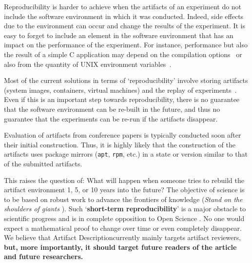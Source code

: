\documentclass[sigconf,natbib=false]{acmart}
\newcommand{\repro}{reproducibility}
\newcommand{\ad}{Artifact Description}
\begin{document}

Reproducibility is harder to achieve when the artifacts of an experiment do not include the software environment in which it was conducted.
Indeed, side effects due to the environment can occur and change the results of the experiment.
It is easy to forget to include an element in the software environment that has an impact on the performance of the experiment.
For instance, performance but also the result of a simple C application may depend on the compilation options\ \cite{stodden2018assessing} or also from the quantity of UNIX environment variables\ \cite{mytkowicz2009producing}.

Most of the current solutions in terms of `\repro' involve storing artifacts (system images, containers, virtual machines) and the replay of experiments\ \cite{rosendo2020e2clab, brammer2011paper, brinckman2019computing}.
Even if this is an important step towards \repro, there is no guarantee that the software environment can be re-built in the future, and thus no guarantee that the experiments can be re-run if the artifacts disappear. 

Evaluation of artifacts from conference papers is typically conducted soon after their initial construction.
Thus, it is highly likely that the construction of the artifacts uses package mirrors (\texttt{apt}, \texttt{rpm}, etc.) in a state or version similar to that of the submitted artifacts.

This raises the question of: What will happen when someone tries to rebuild the artifact environment 1, 5, or 10 years into the future?
The objective of science is to be based on robust work to advance the frontiers of knowledge (\emph{Stand on the shoulders of giants} \cite{giant}).
Such `\textbf{short-term reproducibility}' is a major obstacle to scientific progress and is in complete opposition to Open Science \cite{openscience_unesco}.
No one would expect a mathematical proof to change over time or even completely disappear.
We believe that \ad currently mainly targets artifact reviewers, \textbf{but, more importantly, it should target future readers of the article and future researchers.}
\end{document}

